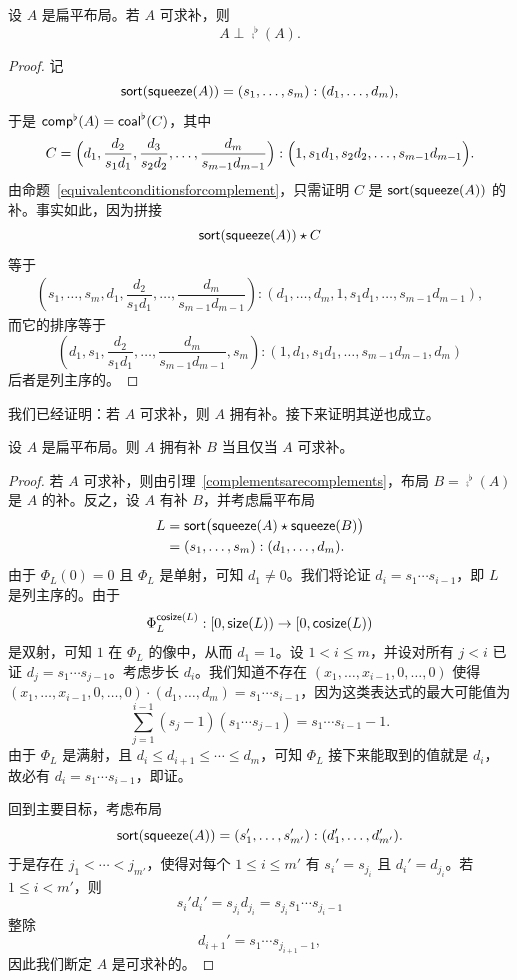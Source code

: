 \begin{lemma}\label{complementsarecomplements}
    设 $A$ 是扁平布局。若 $A$ 可求补，则
    \[A \perp \comp^\flat(A).\]
\end{lemma}

\begin{proof}
    记
    \[\mathsf{sort}(\mathsf{squeeze}(A)) = (s_1,\dots,s_m):(d_1,\dots,d_m),\]
    于是 $\mathsf{comp}^\flat(A) = \mathsf{coal}^\flat(C)$，其中
    \[C = \Bigl(d_1 , \dfrac{d_2}{s_1d_1} , \dfrac{d_3}{s_2d_2} , \dots ,\dfrac{d_m}{s_{m-1}d_{m-1}} \Bigr) : \Bigl(1 , s_1d_1 , s_2d_2, \dots ,s_{m-1}d_{m-1}\Bigr).
    \]
    由命题~\ref{equivalentconditionsforcomplement}，只需证明 $C$ 是 $\mathsf{sort}(\mathsf{squeeze}(A))$ 的补。事实如此，因为拼接
    \[
    \mathsf{sort}(\mathsf{squeeze}(A)) \star C
    \]
    等于
    \begin{align*}
    \left(s_1,\dots,s_m,d_1,\dfrac{d_2}{s_1d_1},\dots,\dfrac{d_m}{s_{m-1}d_{m-1}}\right):(d_1,\dots,d_m,1,s_1d_1,\dots, s_{m-1}d_{m-1}),
    \end{align*}
    而它的排序等于
    \[
    \left(d_1,s_1, \dfrac{d_2}{s_1d_1},\dots, \dfrac{d_m}{s_{m-1}{d_{m-1}}}, s_m \right):(1,d_1,s_1d_1, \dots ,s_{m-1}d_{m-1}, d_m)
    \]
    后者是列主序的。
\end{proof}

我们已经证明：若 $A$ 可求补，则 $A$ 拥有补。接下来证明其逆也成立。

\begin{proposition}\label{complementableproposition}
    设 $A$ 是扁平布局。则 $A$ 拥有补 $B$ 当且仅当 $A$ 可求补。
\end{proposition}

\begin{proof}
    若 $A$ 可求补，则由引理~\ref{complementsarecomplements}，布局 $B = \comp^\flat(A)$ 是 $A$ 的补。反之，设 $A$ 有补 $B$，并考虑扁平布局
    \begin{align*} L & = \mathsf{sort}\bigl(\mathsf{squeeze}(A)\star \mathsf{squeeze}(B)\bigr) \\
    & = (s_1,\dots,s_m):(d_1,\dots,d_m).
    \end{align*}
    由于 $\Phi_L(0) = 0$ 且 $\Phi_L$ 是单射，可知 $d_1 \neq 0$。我们将论证 $d_i = s_1 \cdots s_{i-1}$，即 $L$ 是列主序的。由于
    \[\Phi_L^{\mathsf{cosize}(L)} : [0,\mathsf{size}(L)) \to [0,\mathsf{cosize}(L))
    \]
    是双射，可知 $1$ 在 $\Phi_L$ 的像中，从而 $d_1 = 1$。设 $1 < i \leq m$，并设对所有 $j < i$ 已证 $d_j = s_1 \cdots s_{j-1}$。考虑步长 $d_{i}$。我们知道不存在 $(x_1,\dots,x_{i-1},0,\dots,0)$ 使得 $(x_1,\dots,x_{i-1},0,\dots,0) \cdot (d_1,\dots,d_m) = s_1\cdots s_{i-1}$，因为这类表达式的最大可能值为
    \[
    \sum_{j = 1}^{i-1} (s_j-1)(s_1\cdots s_{j-1}) = s_1 \cdots s_{i-1} - 1.
    \]
    由于 $\Phi_L$ 是满射，且 $d_i \leq  d_{i+1} \leq  \cdots \leq  d_m$，可知 $\Phi_L$ 接下来能取到的值就是 $d_i$，故必有 $d_i = s_1\cdots s_{i-1}$，即证。

    回到主要目标，考虑布局
    \[\mathsf{sort}(\mathsf{squeeze}(A)) = (s_1',\dots,s_{m'}'):(d_1',\dots,d_{m'}').\] 于是存在 $j_1 < \cdots < j_{m'}$，使得对每个 $1 \leq i \leq m'$ 有 $s_i' = s_{j_i}$ 且 $d_i' = d_{j_i}$。若 $1 \leq i < m'$，则
    \[
    s_i'd_i' = s_{j_i}d_{j_i} = s_{j_i} s_1 \cdots s_{j_i - 1}
    \]
    整除
    \[
    d_{i+1}' = s_1 \cdots s_{j_{i+1}-1},
    \]
    因此我们断定 $A$ 是可求补的。
\end{proof}


